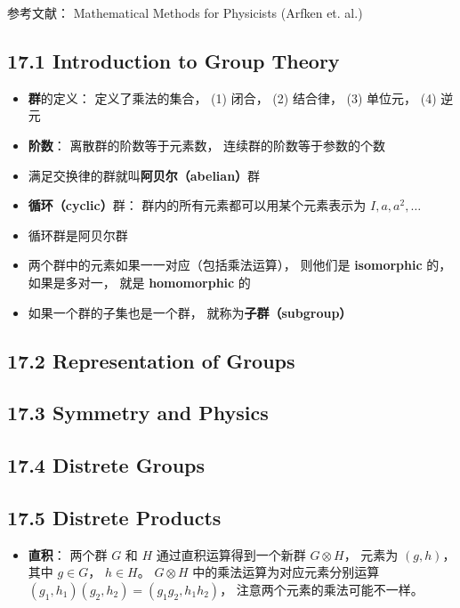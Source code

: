 
参考文献： Mathematical Methods for Physicists (Arfken et. al.)

\subsection{17.1 Introduction to Group Theory}
\begin{itemize}
\item \textbf{群}的定义： 定义了乘法的集合， (1) 闭合， (2) 结合律， (3) 单位元， (4) 逆元

\item \textbf{阶数}： 离散群的阶数等于元素数， 连续群的阶数等于参数的个数

\item 满足交换律的群就叫\textbf{阿贝尔（abelian）}群

\item \textbf{循环（cyclic）}群： 群内的所有元素都可以用某个元素表示为 $I, a, a^2, \dots$

\item 循环群是阿贝尔群

\item 两个群中的元素如果一一对应（包括乘法运算）， 则他们是 \textbf{isomorphic} 的， 如果是多对一， 就是 \textbf{homomorphic} 的

\item 如果一个群的子集也是一个群， 就称为\textbf{子群（subgroup）}
\end{itemize}

\subsection{17.2 Representation of Groups}

\subsection{17.3 Symmetry and Physics}

\subsection{17.4 Distrete Groups}

\subsection{17.5 Distrete Products}
\begin{itemize}
\item \textbf{直积}： 两个群 $G$ 和 $H$ 通过直积运算得到一个新群 $G \otimes H$， 元素为 $(g, h)$， 其中 $g\in G$， $h\in H$。 $G \otimes H$ 中的乘法运算为对应元素分别运算 $(g_1, h_1)(g_2, h_2) = (g_1 g_2, h_1 h_2)$， 注意两个元素的乘法可能不一样。
\end{itemize}

